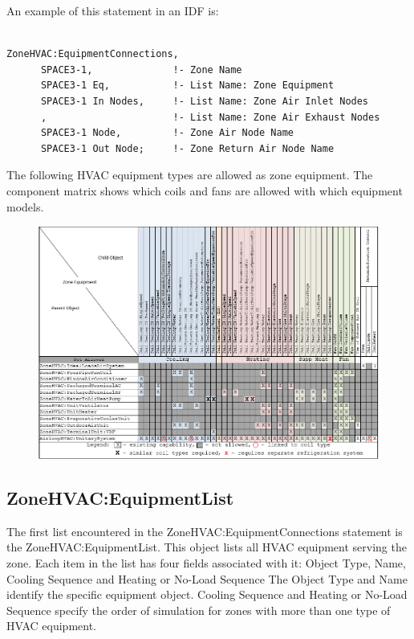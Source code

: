 An example of this statement in an IDF is:

\begin{lstlisting}

ZoneHVAC:EquipmentConnections,
      SPACE3-1,              !- Zone Name
      SPACE3-1 Eq,           !- List Name: Zone Equipment
      SPACE3-1 In Nodes,     !- List Name: Zone Air Inlet Nodes
      ,                      !- List Name: Zone Air Exhaust Nodes
      SPACE3-1 Node,         !- Zone Air Node Name
      SPACE3-1 Out Node;     !- Zone Return Air Node Name
\end{lstlisting}

The following HVAC equipment types are allowed as zone equipment. The component matrix shows which coils and fans are allowed with which equipment models.

\begin{figure}[htbp]
\centering
\includegraphics{media/ZoneComponentMatrix.png}
\caption{}
\end{figure}

\subsection{ZoneHVAC:EquipmentList}\label{zonehvacequipmentlist}

The first list encountered in the ZoneHVAC:EquipmentConnections statement is the ZoneHVAC:EquipmentList. This object lists all HVAC equipment serving the zone. Each item in the list has four fields associated with it: Object Type, Name, Cooling Sequence and Heating or No-Load Sequence The Object Type and Name identify the specific equipment object. Cooling Sequence and Heating or No-Load Sequence specify the order of simulation for zones with more than one type of HVAC equipment.

